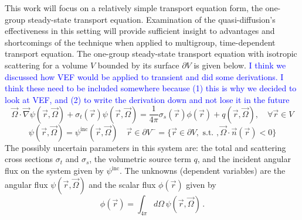 \documentclass[12pt]{report}
\newcommand{\vr}{\vec{r}}
\newcommand{\vO}{\vec{\Omega}}
\newcommand{\grad}{\vec{\nabla}}
\newcommand{\sigt}{\sigma_t}
\newcommand{\sigs}{\sigma_s}
\newcommand{\comment}[2]{\marginpar{\textcolor{#2}{$\star$}}\textcolor{#2}{#1}\newline}
\newcommand{\jcr}[1]{\comment{#1}{blue}}
\newcommand{\jcr}[1]{\phantom{a}}
\begin{document}
This work will focus on a relatively simple transport equation form, the one-group steady-state transport equation. Examination of the quasi-diffusion's effectiveness in this setting will provide sufficient insight to advantages and shortcomings of the technique when applied to multigroup, time-dependent transport equation. The one-group steady-state transport equation with isotropic scattering for a volume $V$ bounded by its surface $\partial V$ is given below.
\jcr{I think we discussed how VEF would be applied to transient and did some derivations. I think these need to be included somewhere because (1) this is why we decided to look at VEF, and (2) to write the derivation down and not lose it in the future}
\begin{equation}
\label{SS1GTE}
\vO \cdot \grad \psi(\vr,\vO) + \sigt(\vr) \psi(\vr,\vO) = \frac{1}{4 \pi} \sigs(\vr) \phi(\vr) + q(\vr,\vO), \quad \forall \vr \in V
\end{equation}
\begin{equation}
\label{SS1GTE_bc}
\psi(\vr,\vO) = \psi^{\text{inc}}(\vr,\vO) \quad \vr \in \partial V^{-} = \{ \vr \in \partial V, \text{ s.t. }, \vO \cdot \vec{n}(\vr) < 0\}
\end{equation}
The possibly uncertain parameters in this system are: the total and scattering cross sections $\sigt$ and $\sigs$, the volumetric source term $q$, and the incident angular flux on the system given by $\psi^{\text{inc}}$. The unknowns (dependent variables) are the angular flux $\psi(\vr,\vO)$ and the scalar flux $\phi(\vr)$ given by
\[
\phi(\vr) = \int_{4\pi}d\Omega\,\psi(\vr,\vO) \,.
\]

\end{document}
